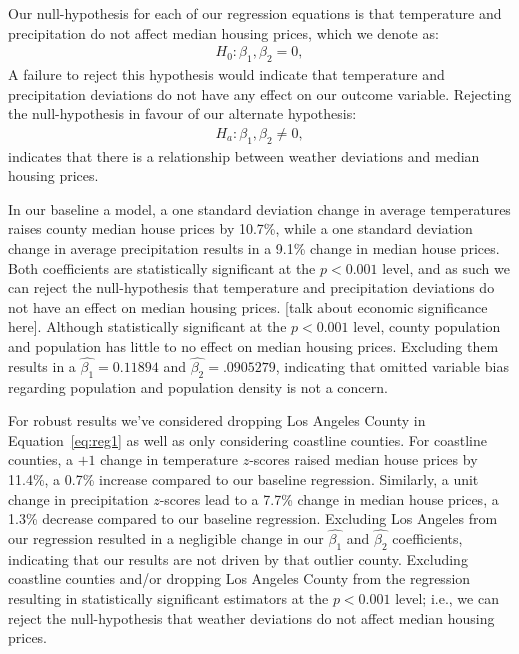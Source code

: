 \documentclass[12pt,reqno]{amsart}
\theoremstyle{definition}
\begin{document}
    Our null-hypothesis for each of our regression equations is that temperature and precipitation do not affect median housing prices, which we denote as:
        \begin{equation*}
        \begin{split}
            H_0: \beta_1,\beta_2 = 0,
        \end{split}
        \end{equation*}
    A failure to reject this hypothesis would indicate that temperature and precipitation deviations do not have any effect on our outcome variable. Rejecting the null-hypothesis in favour of our alternate hypothesis:
        \begin{equation*}
        \begin{split}
            H_a:\beta_1,\beta_2 \neq 0,
        \end{split}
        \end{equation*}
    indicates that there is a relationship between weather deviations and median housing prices. 

    
    
    In our baseline a model, a one standard deviation change in average temperatures raises county median house prices by 10.7\%, while a one standard deviation change in average precipitation results in a 9.1\% change in median house prices. Both coefficients are statistically significant at the $p < 0.001$ level, and as such we can reject the null-hypothesis that temperature and precipitation deviations do not have an effect on median housing prices. [talk about economic significance here]. Although statistically significant at the $p < 0.001$ level, county population and population has little to no effect on median housing prices. Excluding them results in a $\widehat{\beta_1} = 0.11894$ and $\widehat{\beta_2} = .0905279$, indicating that omitted variable bias regarding population and population density is not a concern.

    

    For robust results we've considered dropping Los Angeles County in Equation~\ref{eq:reg1} as well as only considering coastline counties. For coastline counties, a $+1$ change in temperature $z$-scores raised median house prices by 11.4\%, a 0.7\% increase compared to our baseline regression. Similarly, a unit change in precipitation $z$-scores lead to a 7.7\% change in median house prices, a 1.3\% decrease compared to our baseline regression. Excluding Los Angeles from our regression resulted in a negligible change in our $\widehat{\beta_1}$ and $\widehat{\beta_2}$ coefficients, indicating that our results are not driven by that outlier county. Excluding coastline counties and/or dropping Los Angeles County from the regression resulting in statistically significant estimators at the $p<0.001$ level; i.e., we can reject the null-hypothesis that weather deviations do not affect median housing prices.
\end{document}
